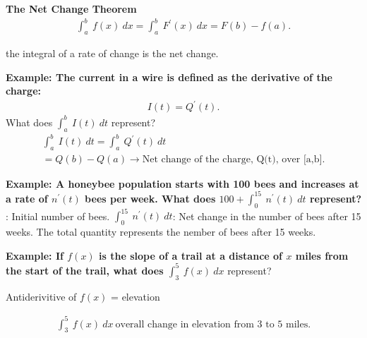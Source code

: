 \documentclass{report}
\begin{document}
\pagebreak \bigbreak \noindent
\begin{mdframed}
  \textbf{The Net Change Theorem}
  \begin{align*}
    \int_{a}^{b}\ f(x)\ dx = \int_{a}^{b}\ F^{\prime}(x)\ dx = F(b) - f(a)
  .\end{align*}
  \begin{center}
    the integral of a rate of change is the net change.
  \end{center}
\end{mdframed}

\bigbreak \noindent 
\begin{mdframed}
  \textbf{Example: The current in a wire is defined as the derivative of the charge:}
  \begin{align*}
    I(t) = Q^{\prime}(t)
  .\end{align*}
  \bigbreak \noindent \bigbreak \noindent
  What does $\int_{a}^{b}\ I(t)\ dt$ represent?
  \begin{align*}
    \int_{a}^{b}\ I(t)\ dt = \int_{a}^{b}\ Q^{\prime}(t)\ dt \\
    = Q(b) - Q(a) \rightarrow \text{Net change of the charge, Q(t), over [a,b]}
  .\end{align*}
\end{mdframed}

\bigbreak \noindent 
\begin{mdframed}
  \textbf{Example: A honeybee population starts with 100 bees and increases at a rate of $n^{\prime}(t)$ bees per week.
    What does $100+\int_{0}^{15}\ n^{\prime}(t)\ dt$ represent? 
  }
  \bigbreak {}: Initial number of bees.
  \bigbreak \noindent 
  $\int_{0}^{15}\ n^{\prime}(t)\ dt$: Net change in the number of bees after 15 weeks.
  \bigbreak \noindent 
  The total quantity represents the nember of bees after 15 weeks.
\end{mdframed}

\bigbreak \noindent 
\begin{mdframed}
  \textbf{Example: If $f(x)$ is the slope of a trail at a distance of $x$ miles from the start of the trail, what does $\int_{3}^{5}\ f(x)\ dx $} represent?
  \begin{center}
    Antiderivitive of $f(x)$ = elevation
  \end{center}
  \begin{align*}
    \int_{3}^{5}\ f(x)\ dx\ \text{overall change in elevation from 3 to 5 miles}
  .\end{align*}
\end{mdframed}
\end{document}
